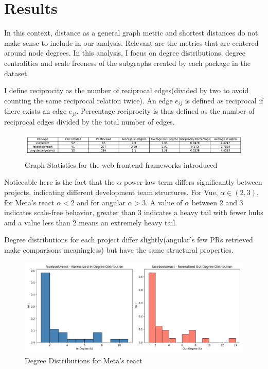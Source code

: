 \documentclass{article}
\begin{document}
\section{Results}
In this context, distance as a general graph metric and shortest distances do not make sense to include in our analysis.
Relevant are the metrics that are centered around node degrees. In this analysis, I focus on degree distributions, degree centralities and scale freeness of the subgraphs created by each package in the dataset.

I define reciprocity as the number of reciprocal edges(divided by two to avoid counting the same reciprocal relation twice). An edge $e_{ij}$ is defined as reciprocal if there exists an edge $e_{ji}$. Percentage reciprocity is thus defined as the number of reciprocal edges divided by the total number of edges.


\begin{figure}[h]
		\includegraphics[width=\textwidth,left,scale=1.25]{repo_analysis_table.pdf}	
		\caption{Graph Statistics for the web frontend frameworks introduced}
\end{figure}

Noticeable here is the fact that the $\alpha$ power-law term differs significantly between projects, indicating different development team structures. For Vue, $\alpha \in (2,3)$, for Meta's react $\alpha < 2$ and for angular $\alpha > 3$. A value of $\alpha$ between 2 and 3 indicates scale-free behavior, greater than 3 indicates a heavy tail with fewer hubs and a value less than 2 means an extremely heavy tail.

Degree distributions for each project differ slightly(angular's few PRs retrieved make comparisons meaningless) but have the same structural properties.

\begin{figure}[H]
	\includegraphics[width=\textwidth,left,scale=1.00]{facebook_react_degree_distribution.pdf}	
	\caption{Degree Distributions for Meta's react}
\end{figure}
\end{document}
